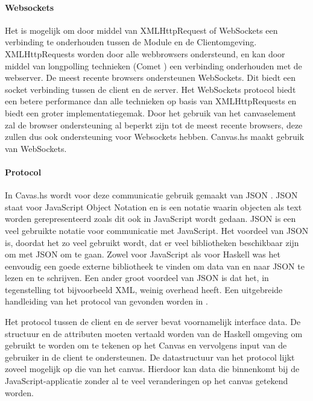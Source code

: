 \paragraph{Websockets}
Het is mogelijk om door middel van XMLHttpRequest of WebSockets een verbinding te onderhouden tussen de Module en de Clientomgeving. XMLHttpRequests worden door alle webbrowsers ondersteund, en kan door middel van longpolling technieken (Comet \cite{comet2007}) een verbinding onderhouden met de webserver. De meest recente browsers ondersteunen WebSockets. Dit biedt een socket verbinding tussen de client en de server. Het WebSockets protocol biedt een betere performance dan alle technieken op basis van XMLHttpRequests en biedt een groter implementatiegemak. Door het gebruik van het canvaselement zal de browser ondersteuning al beperkt zijn tot de meest recente browsers, deze zullen dus ook ondersteuning voor Websockets hebben. Canvas.hs maakt gebruik van WebSockets.

\paragraph{Protocol}
In Cavas.hs wordt voor deze communicatie gebruik gemaakt van JSON \cite{JSON2006}. JSON staat voor JavaScript Object Notation en is een notatie waarin objecten als text worden gerepresenteerd zoals dit ook in JavaScript wordt gedaan. JSON is een veel gebruikte notatie voor communicatie met JavaScript. Het voordeel van JSON is, doordat het zo veel gebruikt wordt, dat er veel bibliotheken beschikbaar zijn om met JSON om te gaan. Zowel voor JavaScript als voor Haskell was het eenvoudig een goede externe bibliotheek te vinden om data van en naar JSON te lezen en te schrijven. Een ander groot voordeel van JSON is dat het, in tegenstelling tot bijvoorbeeld XML, weinig overhead heeft. Een uitgebreide handleiding van het protocol van gevonden worden in \cite{Protocol2013}.

Het protocol tussen de client en de server bevat voornamelijk interface data. De structuur en de attributen moeten vertaald worden van de Haskell omgeving om gebruikt te worden om te tekenen op het Canvas en vervolgens input van de gebruiker in de client te ondersteunen. De datastructuur van het protocol lijkt zoveel mogelijk op die van het canvas. Hierdoor kan data die binnenkomt bij de JavaScript-applicatie zonder al te veel veranderingen op het canvas getekend worden.

